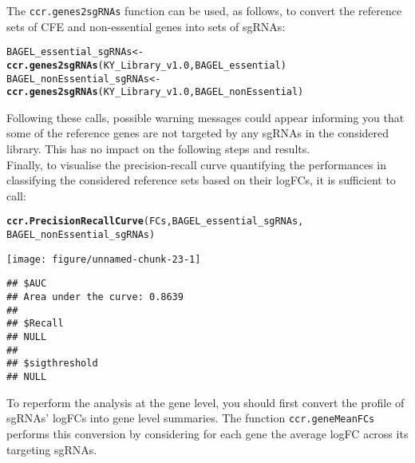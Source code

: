 \documentclass{article}\usepackage[]{graphicx}\usepackage[]{color}
\makeatletter
\def\maxwidth{ %
  \ifdim\Gin@nat@width>\linewidth
    \linewidth
  \else
    \Gin@nat@width
  \fi
}
\newcommand{\hlstd}[1]{\textcolor[rgb]{0.345,0.345,0.345}{#1}}%
\newcommand{\hlkwb}[1]{\textcolor[rgb]{0.69,0.353,0.396}{#1}}%
\newcommand{\hlkwd}[1]{\textcolor[rgb]{0.737,0.353,0.396}{\textbf{#1}}}%
\newenvironment{kframe}{%
 \def\at@end@of@kframe{}%
 \ifinner\ifhmode%
  \def\at@end@of@kframe{\end{minipage}}%
  \begin{minipage}{\columnwidth}%
 \fi\fi%
 \def\FrameCommand##1{\hskip\@totalleftmargin \hskip-\fboxsep
 \colorbox{shadecolor}{##1}\hskip-\fboxsep
     \hskip-\linewidth \hskip-\@totalleftmargin \hskip\columnwidth}%
 \MakeFramed {\advance\hsize-\width
   \@totalleftmargin\z@ \linewidth\hsize
   \@setminipage}}%
 {\par\unskip\endMakeFramed%
 \at@end@of@kframe}
\newenvironment{knitrout}{}{} %
\makeatother
\begin{document}
The \texttt{ccr.genes2sgRNAs} function can be used, as follows, to convert the reference sets of CFE and non-essential genes into sets of sgRNAs:



\begin{knitrout}
\color{fgcolor}\begin{kframe}
\begin{alltt}
\hlstd{BAGEL_essential_sgRNAs}\hlkwb{<-}
    \hlkwd{ccr.genes2sgRNAs}\hlstd{(KY_Library_v1.0,BAGEL_essential)}
\hlstd{BAGEL_nonEssential_sgRNAs}\hlkwb{<-}
    \hlkwd{ccr.genes2sgRNAs}\hlstd{(KY_Library_v1.0,BAGEL_nonEssential)}
\end{alltt}
\end{kframe}
\end{knitrout}



Following these calls, possible warning messages could appear informing you that some of the reference genes are not targeted by any sgRNAs in the considered library. This has no impact on the following steps and results.\\

Finally, to visualise the precision-recall curve quantifying the performances in classifying the considered reference sets based on their logFCs, it is sufficient to call:
\begin{knitrout}
\color{fgcolor}\begin{kframe}
\begin{alltt}
\hlkwd{ccr.PrecisionRecallCurve}\hlstd{(FCs,BAGEL_essential_sgRNAs,}
                              \hlstd{BAGEL_nonEssential_sgRNAs)}
\end{alltt}
\end{kframe}
\texttt{[image: figure/unnamed-chunk-23-1]} 
\begin{kframe}\begin{verbatim}
## $AUC
## Area under the curve: 0.8639
## 
## $Recall
## NULL
## 
## $sigthreshold
## NULL
\end{verbatim}
\end{kframe}
\end{knitrout}
% 
To reperform the analysis at the gene level, you should first convert the profile of sgRNAs' logFCs into gene level summaries. The function \texttt{ccr.geneMeanFCs} performs this conversion by considering for each gene the average logFC across its targeting sgRNAs.
\end{document}
